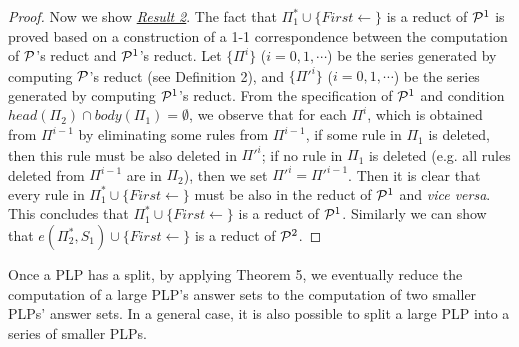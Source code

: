 \documentclass{tlp}
\begin{document}
\begin{proof}
{}

Now we show \underline{\em Result 2}. 
The fact that $\Pi_{1}^{*}\cup \{First\leftarrow\}$ is a reduct of ${\cal P}^{1}$ is proved
based on a construction of a 1-1 correspondence between the computation of
${\cal P}$'s reduct and ${\cal P}^{1}$'s reduct.
Let $\{\Pi^{i}\}$ ($i=0, 1, \cdots$)
be the series generated by computing ${\cal P}$'s reduct
(see Definition 2), and $\{\Pi'^{i}\}$ ($i=0, 1, \cdots$) be the series
generated by computing ${\cal P}^{1}$'s reduct. From the specification of
${\cal P}^{1}$ and condition $head(\Pi_{2})\cap body(\Pi_{1})=\emptyset$,
we observe that for each $\Pi^{i}$, which is obtained from
$\Pi^{i-1}$ by eliminating some rules from $\Pi^{i-1}$,
if some rule in $\Pi_{1}$ is deleted, then this rule must be also deleted in
$\Pi'^{i}$; if no rule in  $\Pi_{1}$ is deleted (e.g. all rules deleted
from $\Pi^{i-1}$ are in $\Pi_{2}$),
then we set $\Pi'^{i}=\Pi'^{i-1}$. Then it is clear that
every rule in $\Pi_{1}^{*}\cup \{First\leftarrow\}$ 
must be also in the reduct of ${\cal P}^{1}$ and
{\em vice versa}. This concludes that $\Pi_{1}^{*}\cup\{First\leftarrow\}$ 
is a reduct of ${\cal P}^{1}$.
Similarly we can show that $e(\Pi_{2}^{*},S_{1})\cup \{First\leftarrow\}$ 
is a reduct of ${\cal P}^{2}$.
\end{proof}

Once a PLP has a split, by applying Theorem 5, 
we eventually reduce the computation of a large PLP's answer sets
to the computation of two smaller PLPs' answer sets.
In a general case, it is also possible to split a large PLP into
a series of smaller PLPs.
\end{document}
